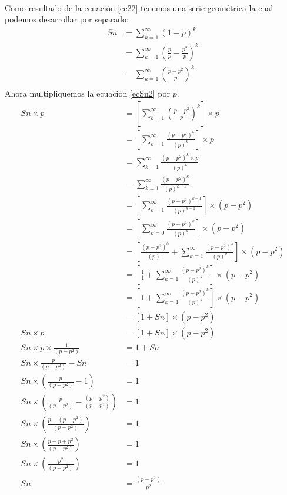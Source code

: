 \documentclass[12pt]{article}
\begin{document}
\paragraph{} Como resultado de la ecuación \ref{ec22} tenemos una serie geométrica la cual podemos desarrollar por separado:\\
\begin{equation}\label{ecSn2}
\begin{split}
Sn & = \sum_{k=1}^{\infty}{(1  - p)^k}\\
& = \sum_{k=1}^{\infty}{(\frac{p}{p} - \frac{p^2}{p})^k}\\
& = \sum_{k=1}^{\infty}{(\frac{p-p^2}{p})^k}\\
\end{split}
\end{equation}
Ahora multipliquemos la ecuación \ref{ecSn2} por $p$.
\begin{equation}\label{ecSn3}
\begin{split}
Sn \times p & = [\sum_{k=1}^{\infty}{(\frac{p-p^2}{p})^k}] \times p\\
& = [\sum_{k=1}^{\infty}{\frac{(p-p^2)^k}{(p)^k}}] \times p\\
& = \sum_{k=1}^{\infty}{\frac{(p-p^2)^k \times p}{(p)^k}}\\
& = \sum_{k=1}^{\infty}{\frac{(p-p^2)^k}{(p)^{k-1}}}\\
& = [\sum_{k=1}^{\infty}{\frac{(p-p^2)^{k-1}}{(p)^{k-1}}}] \times (p-p^2)\\
& = [\sum_{k=0}^{\infty}{\frac{(p-p^2)^{k}}{(p)^{k}}}] \times (p-p^2)\\
& = [\frac{(p-p^2)^{0}}{(p)^{0}} + \sum_{k=1}^{\infty}{\frac{(p-p^2)^{k}}{(p)^{k}}}] \times (p-p^2)\\
& = [\frac{1}{1} + \sum_{k=1}^{\infty}{\frac{(p-p^2)^{k}}{(p)^{k}}}] \times (p-p^2)\\
& = [1 + \sum_{k=1}^{\infty}{\frac{(p-p^2)^{k}}{(p)^{k}}}] \times (p-p^2)\\
& = [1 + Sn] \times (p-p^2)\\
Sn \times p & = [1 + Sn] \times (p-p^2)\\
Sn \times p \times \frac{1}{(p-p^2)} & = 1 + Sn\\
Sn  \times \frac{p}{(p-p^2)} - Sn & = 1\\
Sn  \times(\frac{p}{(p-p^2)} - 1) & = 1\\
Sn  \times(\frac{p}{(p-p^2)} - \frac{(p-p^2)}{(p-p^2)}) & = 1\\
Sn  \times(\frac{p- (p-p^2)}{(p-p^2)}) & = 1\\
Sn  \times(\frac{p- p+p^2}{(p-p^2)}) & = 1\\
Sn  \times(\frac{p^2}{(p-p^2)}) & = 1\\
Sn  & = \frac{(p-p^2)}{p^2}\\
\end{split}
\end{equation}
\end{document}
